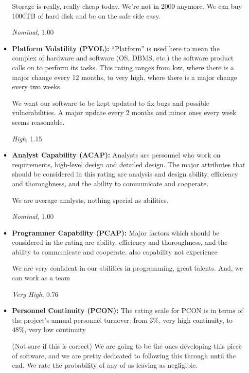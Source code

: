 \documentclass[english]{article}
\begin{document}
\begin{itemize}
Storage is really, really cheap today. We're not in 2000 anymore.
We can buy 1000TB of hard disk and be on the safe side easy.

\textit{Nominal}, 1.00


\item \textbf{Platform Volatility (PVOL):} “Platform” is used here to mean the complex of hardware and software (OS, DBMS, etc.)
the software product calls on to perform its tasks. This rating ranges from low, where there is a major change every 12 months, to very high, where there is a major change every two weeks.

We want our software to be kept updated to fix bugs and possible vulnerabilities. A major update every 2 months and minor ones every week seems reasonable.

\textit{High}, 1.15


\item \textbf{Analyst Capability (ACAP):} Analysts are personnel who work on requirements, high-level design and detailed design. The major attributes that should be considered in this rating are analysis and design ability, efficiency and thoroughness, and the ability to communicate and cooperate.

We are average analysts, nothing special as abilities.

\textit{Nominal}, 1.00

\item \textbf{Programmer Capability (PCAP):} Major factors which should be considered in the rating are ability, efficiency and thoroughness, and the ability to communicate and cooperate. also capability not experience

We are very confident in our abilities in programming, great talents. And, we can work as a team

\textit{Very High}, 0.76


\item \textbf{Personnel Continuity (PCON):} The rating scale for PCON is in terms of the project’s annual personnel turnover: from
3\%, very high continuity, to 48\%, very low continuity

(Not sure if this is correct) We are going to be the ones developing this piece of software, and we are pretty dedicated to following this through until the end. We rate the probability of any of us leaving as negligible.


\end{itemize}
\end{document}
